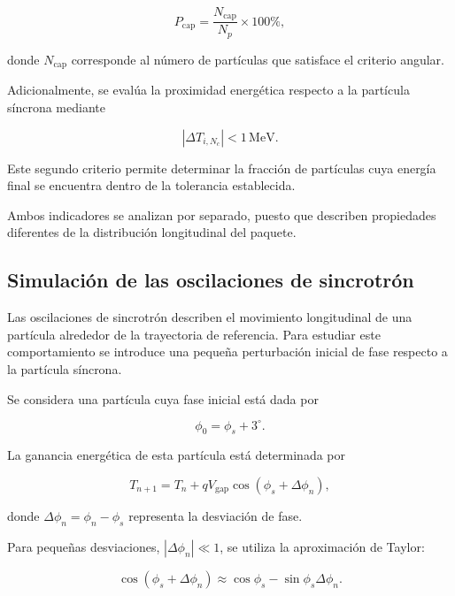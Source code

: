 \begin{equation}
    P_{\mathrm{cap}}
    =
    \frac{N_{\mathrm{cap}}}{N_p}\times100\%,
\end{equation}

donde $N_{\mathrm{cap}}$ corresponde al número de partículas que satisface el criterio angular.

Adicionalmente, se evalúa la proximidad energética respecto a la partícula síncrona mediante

\begin{equation}
    |\Delta T_{i,N_c}|<1\,\mathrm{MeV}.
\end{equation}

Este segundo criterio permite determinar la fracción de partículas cuya energía final se encuentra dentro de la tolerancia establecida.

Ambos indicadores se analizan por separado, puesto que describen propiedades diferentes de la distribución longitudinal del paquete.

\subsection{Simulación de las oscilaciones de sincrotrón}

Las oscilaciones de sincrotrón describen el movimiento longitudinal de una partícula alrededor de la trayectoria de referencia. Para estudiar este comportamiento se introduce una pequeña perturbación inicial de fase respecto a la partícula síncrona.

Se considera una partícula cuya fase inicial está dada por

\begin{equation}
    \phi_0=\phi_s+3^\circ.
\end{equation}

La ganancia energética de esta partícula está determinada por

\begin{equation}
    T_{n+1}
    =
    T_n+
    qV_{\mathrm{gap}}
    \cos(\phi_s+\Delta\phi_n),
\end{equation}

donde $\Delta\phi_n=\phi_n-\phi_s$ representa la desviación de fase.

Para pequeñas desviaciones, $|\Delta\phi_n|\ll1$, se utiliza la aproximación de Taylor:

\begin{equation}
    \cos(\phi_s+\Delta\phi_n)
    \approx
    \cos\phi_s-\sin\phi_s\Delta\phi_n.
\end{equation}

